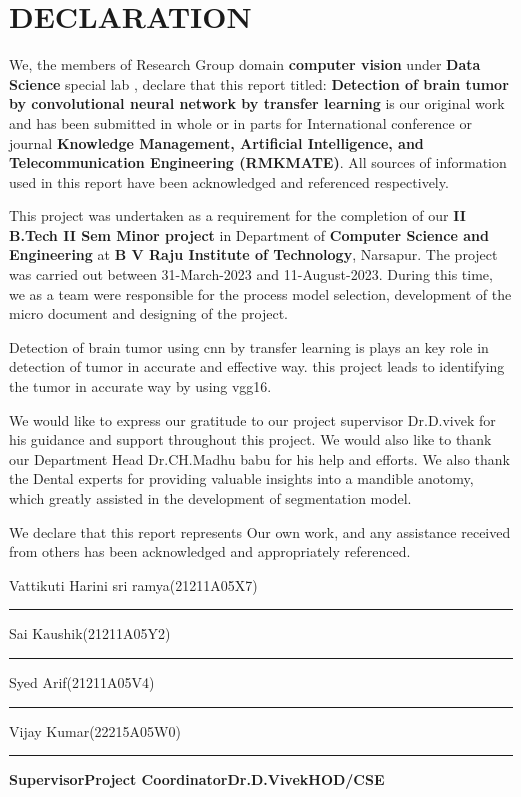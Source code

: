 
\newpage
\section*{DECLARATION} 
\vspace{1mm}
\quad We, the members of Research Group domain \textbf{computer vision} under \textbf{Data Science } special lab , declare that this report titled: \textbf{Detection of brain tumor by convolutional neural network by transfer learning } is our original work and has been submitted in whole or in parts for International conference or journal \textbf{Knowledge Management, Artificial Intelligence, and Telecommunication Engineering (RMKMATE)}. All sources of information used in this report have been acknowledged and referenced respectively.

\quad This project was undertaken as a requirement for the completion of our \textbf{II B.Tech II Sem Minor project} in Department of \textbf{Computer Science and Engineering} at \textbf{B V Raju Institute of Technology}, Narsapur. The project was carried out between 31-March-2023 and 11-August-2023. During this time, we as a team were responsible for the process model selection, development of the micro document and designing of the project.

\quad  Detection of brain tumor using cnn by transfer learning is plays an key role in detection of tumor in accurate and effective way. this project leads to identifying the tumor in accurate way by using vgg16.

\quad We would like to express our gratitude to our project supervisor Dr.D.vivek for his guidance and support throughout this project. We would also like to thank our Department Head Dr.CH.Madhu babu for his help and efforts. We also thank the Dental experts for providing valuable insights into a mandible anotomy, which greatly assisted in the development of segmentation model.

\quad We declare that this report represents Our own work, and any assistance received from others has been acknowledged and appropriately referenced.







\vskip 1mm
  {\bf}
Vattikuti Harini sri ramya\hspace{1.3cm}(21211A05X7) \hspace{0.4cm}  \rule{0.3\textwidth}{0.5pt}
\vskip 0.1mm
Sai Kaushik\hspace{2.1cm}(21211A05Y2) \hspace{0.4cm}  \rule{0.3\textwidth}{0.5pt}
\vskip 0.1mm
Syed Arif\hspace{2.1cm}(21211A05V4) \hspace{0.4cm}  \rule{0.3\textwidth}{1pt}
\vskip 0.1mm
Vijay Kumar\hspace{2.0cm}(22215A05W0) \hspace{0.4cm}  \rule{0.3\textwidth}{1pt}
\vspace{0.3cm} 


\textbf{Supervisor}\hspace{1.5cm}\textbf{Project Coordinator}\hspace{1.5cm}\textbf{Dr.D.Vivek}\hspace{1.5cm}\textbf{HOD/CSE}

